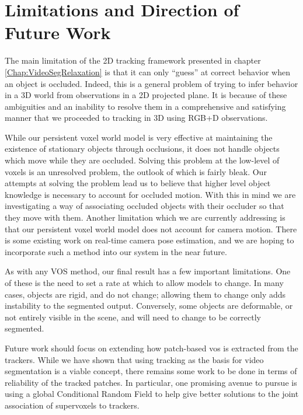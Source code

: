 \section{Limitations and Direction of Future Work}
The main limitation of the 2D tracking framework presented in chapter \ref{Chap:VideoSegRelaxation} is that it can only ``guess'' at correct behavior when an object is occluded. Indeed, this is a general problem of trying to infer behavior in a 3D world from observations in a 2D projected plane. It is because of these ambiguities and an inability to resolve them in a comprehensive and satisfying manner that we proceeded to tracking in 3D using RGB+D observations.

While our persistent voxel world model is very effective at maintaining the existence of stationary objects through occlusions, it does not handle objects which move while they are occluded. Solving this problem at the low-level of voxels is an unresolved problem, the outlook of which is fairly bleak. Our attempts at solving the problem lead us to believe that higher level object knowledge is necessary to account for occluded motion. With this in mind we are investigating a way of associating occluded objects with their occluder so that they move with them. Another limitation which we are currently addressing is that our persistent voxel world model does not account for camera motion. There is some existing work on real-time camera pose estimation, and we are hoping to incorporate such a method into our system in the near future.

As with any VOS method, our final result has a few important limitations. One of these is the need to set a rate at which to allow models to change. In many cases, objects are rigid, and do not change; allowing them to change only adds instability to the segmented output. Conversely, some objects are deformable, or not entirely visible in the scene, and will need to change to be correctly segmented. 

Future work should focus on extending how patch-based \gls{vos} is extracted from the trackers. While we have shown that using tracking as the basis for video segmentation is a viable concept, there remains some work to be done in terms of reliability of the tracked patches. In particular, one promising avenue to pursue is using a global Conditional Random Field to help give better solutions to the joint association of supervoxels to trackers. 


